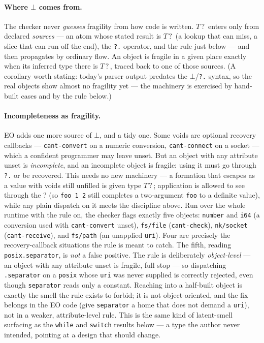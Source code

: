 \documentclass[10pt]{article}
\newcommand{\opt}{\mathbin{?}}       %
\begin{document}
\paragraph{Where $\bot$ comes from.} The checker never \emph{guesses} fragility
from how code is written. $T\opt$ enters only from declared \emph{sources} --- an
atom whose stated result is $T\opt$ (a lookup that can miss, a slice that can run
off the end), the \verb|?.| operator, and the rule just below --- and then
propagates by ordinary flow. An object is fragile in a given place exactly when
its inferred type there is $T\opt$, traced back to one of those sources. (A
corollary worth stating: today's parser output predates the $\bot$/\verb|?.|
syntax, so the real objects show almost no fragility yet --- the machinery is
exercised by hand-built cases and by the rule below.)

\paragraph{Incompleteness as fragility.} EO adds one more source of $\bot$, and a
tidy one. Some voids are optional recovery callbacks --- \verb|cant-convert| on a
numeric conversion, \verb|cant-connect| on a socket --- which a confident
programmer may leave unset. But an object with any attribute unset is
\emph{incomplete}, and an incomplete object is fragile: using it must go through
\verb|?.| or be recovered. This needs no new machinery --- a formation that
escapes as a value with voids still unfilled is given type $T\opt$; application is
allowed to see through the $\opt$ (so \verb|foo 1 2| still completes a
two-argument \verb|foo| to a definite value), while any plain dispatch on it meets
the discipline above. Run over the whole runtime with the rule on, the checker
flags exactly five objects: \verb|number| and \verb|i64| (a conversion used with
\verb|cant-convert| unset), \verb|fs/file| (\verb|cant-check|), \verb|nk/socket|
(\verb|cant-receive|), and \verb|fs/path| (an unapplied \verb|uri|). Four are
precisely the recovery-callback situations the rule is meant to catch. The fifth,
reading \verb|posix.separator|, is \emph{not} a false positive. The rule is
deliberately \emph{object-level} --- an object with any attribute unset is
fragile, full stop --- so dispatching \verb|.separator| on a \verb|posix| whose
\verb|uri| was never supplied is correctly rejected, even though \verb|separator|
reads only a constant. Reaching into a half-built object is exactly the smell the
rule exists to forbid; it is not object-oriented, and the fix belongs in the EO
code (give \verb|separator| a home that does not demand a \verb|uri|), not in a
weaker, attribute-level rule. This is the same kind of latent-smell surfacing as
the \verb|while| and \verb|switch| results below --- a type the author never
intended, pointing at a design that should change.
\end{document}

